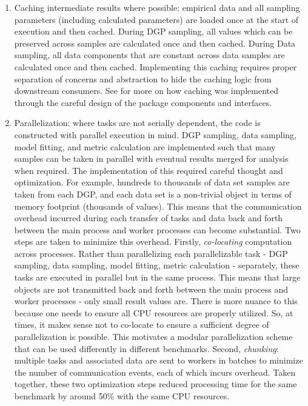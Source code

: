 \documentclass[./main.tex]{subfiles}
\begin{document}
\begin{enumerate}
    \item Caching intermediate results where possible: empirical data and all sampling parameters (including calculated parameters) are loaded once at the start of execution and then cached. During DGP sampling, all values which can be preserved across samples are calculated once and then cached. During Data sampling, all data components that are constant across data samples are calculated once and then cached. Implementing this caching requires proper separation of concerns and abstraction to hide the caching logic from downstream consumers. See  for more on how caching was implemented through the careful design of the package components and interfaces.
    
    \item Parallelization: where tasks are not serially dependent, the code is constructed with parallel execution in mind. DGP sampling, data sampling, model fitting, and metric calculation are implemented such that many samples can be taken in parallel with eventual results merged for analysis when required. The implementation of this required careful thought and optimization. For example, hundreds to thousands of data set samples are taken from each DGP, and each data set is a non-trivial object in terms of memory footprint (thousands of values). This means that the communication overhead incurred during each transfer of tasks and data back and forth between the main process and worker processes can become substantial. Two steps are taken to minimize this overhead. Firstly, \textit{co-locating} computation across processes. Rather than parallelizing each parallelizable task - DGP sampling, data sampling, model fitting, metric calculation - separately, these tasks are executed in parallel but in the same process. This means that large objects are not transmitted back and forth between the main process and worker processes - only small result values are. There is more nuance to this because one needs to ensure all CPU resources are properly utilized. So, at times, it makes sense not to co-locate to ensure a sufficient degree of parallelization is possible. This motivates a modular parallelization scheme that can be used differently in different benchmarks. Second, \textit{chunking}: multiple tasks and associated data are sent to workers in batches to minimize the number of communication events, each of which incurs overhead. Taken together, these two optimization steps reduced processing time for the same benchmark by around 50\% with the same CPU resources.
\end{enumerate}
 
\end{document}
